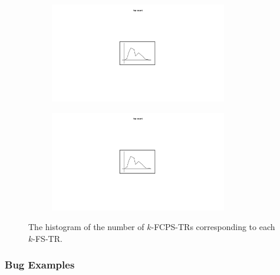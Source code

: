 \begin{figure}
  \centering
  \begin{subfigure}{0.45\textwidth}
    \centering
    \includegraphics[width=0.85\textwidth]{img/fcp-count-1}
  \end{subfigure}
  \begin{subfigure}{0.45\textwidth}
    \centering
    \includegraphics[width=0.85\textwidth]{img/fcp-count-1}
  \end{subfigure}
  \caption{
    The histogram of the number of $k$-FCPS-TRs corresponding to each $k$-FS-TR.
  }
  \label{fig:spec-cfg-id}
\end{figure}

\todo


\subsubsection{Bug Examples}\label{sec:k-fs-example}

\todo


